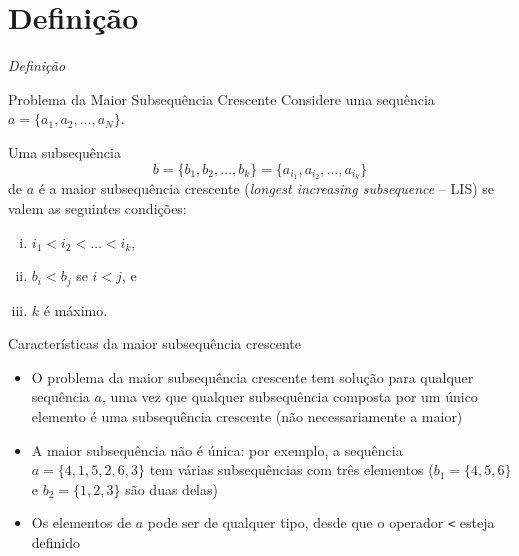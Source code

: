 \section{Definição}

\begin{frame}[fragile]{{\it Definição}}

    \begin{block}{Problema da Maior Subsequência Crescente}
        Considere uma sequência $a = \{ a_1, a_2, \ldots, a_N \}$.

        Uma subsequência 
        \[
            b = \{ b_1, b_2, \ldots, b_k \} = \{ a_{i_1}, a_{i_2}, \ldots, a_{i_k} \}
        \]
        de $a$ é a maior subsequência crescente (\textit{longest increasing subsequence} --
        LIS) se valem as seguintes condições:
        \begin{enumerate}[i.]
            \item $i_1 < i_2 < \ldots < i_k$, 
            \item $b_i < b_j$ se $i < j$, e
            \item $k$ é máximo.
        \end{enumerate}
    \end{block}

\end{frame}

\begin{frame}[fragile]{Características da maior subsequência crescente}

    \begin{itemize}
        \item O problema da maior subsequência crescente tem solução para qualquer 
            sequência $a$, uma vez que qualquer subsequência composta por um único elemento
            é uma subsequência crescente (não necessariamente a maior)

        \item A maior subsequência não é única: por exemplo, a sequência $a = \{ 4, 1, 5, 2,
            6, 3 \}$ tem várias subsequências com três elementos ($b_1 = \{ 4, 5 ,6 \}$ e 
            $b_2 = \{ 1, 2, 3 \}$ são duas delas)

        \item Os elementos de $a$ pode ser de qualquer tipo, desde que o operador 
            \texttt{<} esteja definido
    \end{itemize}

\end{frame}
